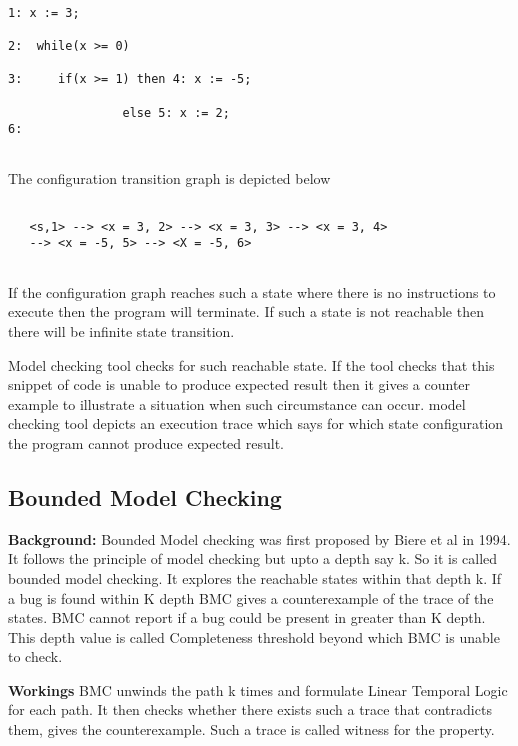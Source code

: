 \begin{verbatim}

1: x := 3;
  
2:  while(x >= 0)
   
3:     if(x >= 1) then 4: x := -5;
     
                else 5: x := 2;
6:          
     
\end{verbatim}

The configuration transition graph is depicted below

\begin{verbatim}

   <s,1> --> <x = 3, 2> --> <x = 3, 3> --> <x = 3, 4>
   --> <x = -5, 5> --> <X = -5, 6>
   
\end{verbatim}


If the configuration graph reaches such a state  where there is no instructions
to execute then the program will terminate. If such a state is not reachable 
then there will be infinite state transition.

  Model checking tool checks for such reachable state. If the tool checks that 
  this snippet of code is unable to produce expected result then it gives a 
  counter example to illustrate a situation when such circumstance can occur.
  model checking tool depicts an execution trace which says for which state 
  configuration the program cannot produce expected result.
  
\subsection{Bounded Model Checking}
  
\textbf{Background:}
Bounded Model checking was first proposed by Biere et al in 1994. It follows
the principle of model checking but upto a depth say k. So it is called bounded
model checking. It explores the reachable states within that depth k. If a bug is
found within K depth BMC gives a counterexample of the trace of the states. BMC
cannot report if a bug could be present in greater than K depth. This depth value
is called Completeness threshold beyond which BMC is unable to check.

\textbf{Workings}
BMC unwinds the path k times and formulate Linear Temporal Logic for each path. 
It then checks whether there exists such a trace that contradicts them, gives 
the counterexample. Such a trace is called witness for the property.

